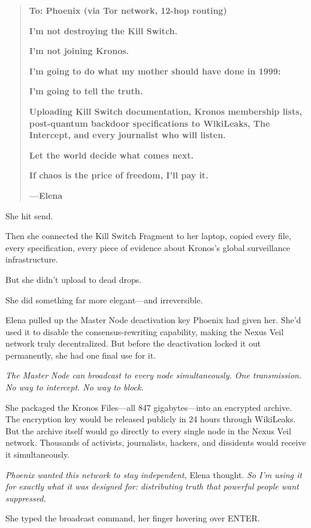 \begin{quote}
\textbf{To: Phoenix (via Tor network, 12-hop routing)}

\textbf{I'm not destroying the Kill Switch.}

\textbf{I'm not joining Kronos.}

\textbf{I'm going to do what my mother should have done in 1999:}

\textbf{I'm going to tell the truth.}

\textbf{Uploading Kill Switch documentation, Kronos membership lists, post-quantum backdoor specifications to WikiLeaks, The Intercept, and every journalist who will listen.}

\textbf{Let the world decide what comes next.}

\textbf{If chaos is the price of freedom, I'll pay it.}

\textbf{---Elena}
\end{quote}

She hit send.

Then she connected the Kill Switch Fragment to her laptop, copied every file, every specification, every piece of evidence about Kronos's global surveillance infrastructure.

But she didn't upload to dead drops.

She did something far more elegant---and irreversible.

Elena pulled up the Master Node deactivation key Phoenix had given her. She'd used it to disable the consensus-rewriting capability, making the Nexus Veil network truly decentralized. But before the deactivation locked it out permanently, she had one final use for it.

\emph{The Master Node can broadcast to every node simultaneously. One transmission. No way to intercept. No way to block.}

She packaged the Kronos Files---all 847 gigabytes---into an encrypted archive. The encryption key would be released publicly in 24 hours through WikiLeaks. But the archive itself would go directly to every single node in the Nexus Veil network. Thousands of activists, journalists, hackers, and dissidents would receive it simultaneously.

\emph{Phoenix wanted this network to stay independent,} Elena thought. \emph{So I'm using it for exactly what it was designed for: distributing truth that powerful people want suppressed.}

She typed the broadcast command, her finger hovering over ENTER.

